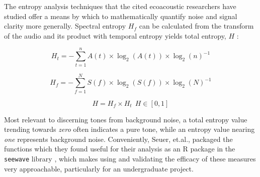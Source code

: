 \documentclass[letterpaper, 12 pt, conference]{ieeeconf}
\begin{document}
    The entropy analysis techniques that the cited ecoacoustic researchers have studied offer a means by which to mathematically quantify noise and signal clarity more generally. Spectral entropy \textit{$H_f$} can be calculated from the transform of the audio and its product with temporal entropy yields total entropy, \textit{$H$} \autocite{Sueur}:

\begin{equation}
H_t = - \sum_{t=1}^{n} A(t) \times \log_2(A(t)) \times \log_2(n)^{-1}
\label{eq:Ht}
\end{equation}

\begin{equation}
H_f = - \sum_{f=1}^{N} S(f) \times \log_2(S(f)) \times \log_2(N)^{-1}
\end{equation}

\begin{equation}
H = H_f \times H_t ~~ H \in [0,1]
\end{equation}

    Most relevant to discerning tones from background noise, a total entropy value trending towards \textit{zero} often indicates a pure tone, while an entropy value nearing \textit{one} represents background noise. Conveniently, Seuer, et.al., packaged the functions which they found useful for their analysis as an R package in the \texttt{seewave} library \autocite{seewaveCran}, which makes using and validating the efficacy of these measures very approachable, particularly for an undergraduate project.
\end{document}
